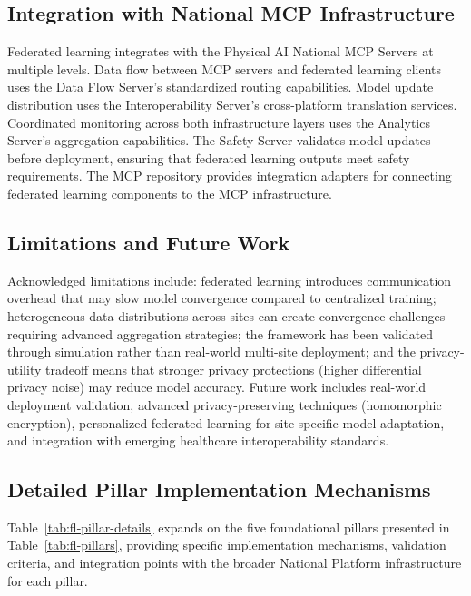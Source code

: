 \subsection{Integration with National MCP Infrastructure}
\label{subsec:fl-mcp-integration}

Federated learning integrates with the Physical AI National MCP Servers
\cite{national-mcp-paper} at multiple levels. Data flow between MCP servers and
federated learning clients uses the Data Flow Server's standardized routing
capabilities. Model update distribution uses the Interoperability Server's
cross-platform translation services. Coordinated monitoring across both
infrastructure layers uses the Analytics Server's aggregation capabilities.
The Safety Server validates model updates before deployment, ensuring that
federated learning outputs meet safety requirements. The MCP repository
\cite{mcp-repo} provides integration adapters for connecting federated
learning components to the MCP infrastructure.

\subsection{Limitations and Future Work}
\label{subsec:fl-limitations}

Acknowledged limitations include: federated learning introduces communication
overhead that may slow model convergence compared to centralized training;
heterogeneous data distributions across sites can create convergence challenges
requiring advanced aggregation strategies; the framework has been validated
through simulation rather than real-world multi-site deployment; and the
privacy-utility tradeoff means that stronger privacy protections (higher
differential privacy noise) may reduce model accuracy. Future work includes
real-world deployment validation, advanced privacy-preserving techniques
(homomorphic encryption), personalized federated learning for site-specific
model adaptation, and integration with emerging healthcare interoperability
standards.

\subsection{Detailed Pillar Implementation Mechanisms}
\label{subsec:fl-pillar-details}

Table~\ref{tab:fl-pillar-details} expands on the five foundational pillars
presented in Table~\ref{tab:fl-pillars}, providing specific implementation
mechanisms, validation criteria, and integration points with the broader
National Platform infrastructure for each pillar.

